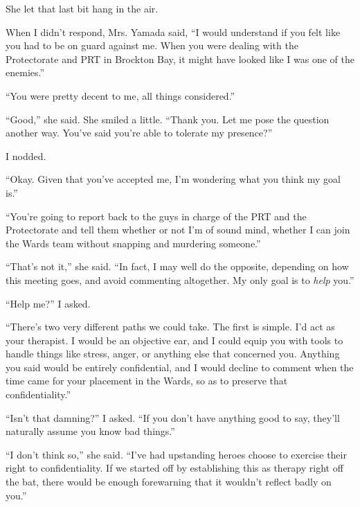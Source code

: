 She let that last bit hang in the air.



When I didn't respond, Mrs. Yamada said, ``I would understand if you felt like you had to be on guard against me.  When you were dealing with the Protectorate and PRT in Brockton Bay, it might have looked like I was one of the enemies.''



``You were pretty decent to me, all things considered.''



``Good,'' she said.  She smiled a little.  ``Thank you.  Let me pose the question another way.  You've said you're able to tolerate my presence?''



I nodded.



``Okay.  Given that you've accepted me, I'm wondering what you think my goal is.''



``You're going to report back to the guys in charge of the PRT and the Protectorate and tell them whether or not I'm of sound mind, whether I can join the Wards team without snapping and murdering someone.''



``That's not it,'' she said.  ``In fact, I may well do the opposite, depending on how this meeting goes, and avoid commenting altogether.  My only goal is to \emph{help} you.''



``Help me?''  I asked.



``There's two very different paths we could take.  The first is simple.  I'd act as your therapist.  I would be an objective ear, and I could equip you with tools to handle things like stress, anger, or anything else that concerned you.  Anything you said would be entirely confidential, and I would decline to comment when the time came for your placement in the Wards, so as to preserve that confidentiality.''



``Isn't that damning?'' I asked.  ``If you don't have anything good to say, they'll naturally assume you know bad things.''



``I don't think so,'' she said.  ``I've had upstanding heroes choose to exercise their right to confidentiality.  If we started off by establishing this as therapy right off the bat, there would be enough forewarning that it wouldn't reflect badly on you.''



